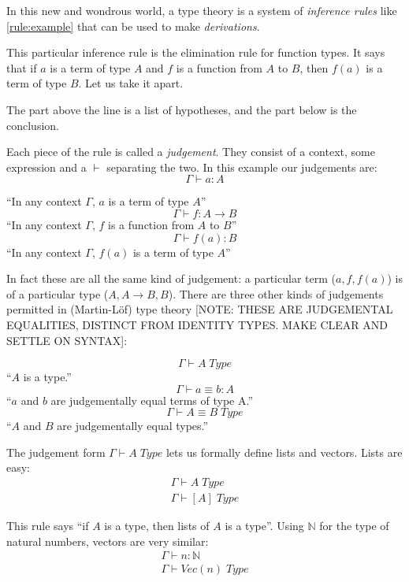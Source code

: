 In this new and wondrous world, a type theory is a system of \emph{inference
  rules} like \ref{rule:example} that can be used to make \emph{derivations}.

This particular inference rule is the elimination rule for function types. It
says that if $a$ is a term of type $A$ and $f$ is a function from $A$ to $B$,
then $f(a)$ is a term of type $B$. Let us take it apart.

The part above the line is a list of hypotheses, and the part below is the conclusion.

Each piece of the rule is called a \emph{judgement}. They consist of a
context, some expression and a $\vdash$ separating the two. In this example our judgements are:
\[\Gamma \vdash a : A\]
\begin{center}
``In any context $\Gamma$, $a$ is a term of type $A$''
\[\Gamma \vdash f : A \rightarrow B\]
``In any context $\Gamma$, $f$ is a function from $A$ to $B$''
\[\Gamma \vdash f(a) : B\]
``In any context $\Gamma$, $f(a)$ is a term of type $A$''
\end{center}

In fact these are all the same kind of judgement: a particular term ($a, f, f(a)$) is of a
particular type ($A, A \rightarrow B, B$). There are three other kinds of
judgements permitted in (Martin-Löf) type theory [NOTE: THESE ARE JUDGEMENTAL
EQUALITIES, DISTINCT FROM IDENTITY TYPES. MAKE CLEAR AND SETTLE ON SYNTAX]:
\begin{center}
  \[\Gamma \vdash A \; Type\]
  ``$A$ is a type.''
  \[\Gamma \vdash a \equiv b : A\]
  ``$a$ and $b$ are judgementally equal terms of type A.''
  \[\Gamma \vdash A \equiv B \; Type\]
  ``$A$ and $B$ are judgementally equal types.''
\end{center}

The judgement form $\Gamma \vdash A \; Type$ lets us formally define lists and
vectors. Lists are easy:
\begin{equation*}
  \begin{array}{c}
    \Gamma \vdash A \; Type \\
    \hline
    \Gamma \vdash [A] \; Type
  \end{array}
  \label{rule:lists}
\end{equation*}

This rule says ``if $A$ is a type, then lists of $A$ is a type''. Using
$\mathbb{N}$ for the type of natural numbers, vectors are very similar:
\begin{equation*}
  \begin{array}{c}
    \Gamma \vdash n : \mathbb{N} \\
    \hline
    \Gamma \vdash Vec (n) \; Type
  \end{array}
  \label{rule:lists}
\end{equation*}

